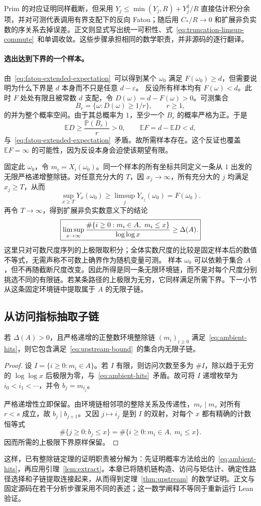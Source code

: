 Prim 的对应证明同样截断，但采用 $Y_j\le\min(Y_j,R)+Y_j^2/R$ 直接估计积分余项，并对可测代表调用有界支配下的反向 Fatou；随后用 $C_*/R\to0$ 和扩展非负实数的序关系去掉误差。正文则显式写出统一可积性、式~\eqref{eq:truncation-limsup-commute}~和单调收敛。这些步骤承担相同的数学职责，并非源码的逐行翻译。

\paragraph{选出达到下界的一个样本。}
由~\eqref{eq:fatou-extended-expectation}~可以得到某个 $\omega_0$ 满足 $F(\omega_0)\ge d$，但需要说明为什么下界是 $d$ 本身而不只是任意 $d-\varepsilon$。
反设所有样本均有 $F(\omega)<d$。此时 $F$ 处处有限且被常数 $d$ 支配，令 $D(\omega)=d-F(\omega)>0$。可测集合
\[
 B_r=\{\omega:D(\omega)\ge1/r\},\qquad r\ge1,
\]
的并为整个概率空间。由于其总概率为 $1$，至少一个 $B_r$ 的概率严格为正。于是
\[
 \mathbb E D\ge\frac{\mathbb P(B_r)}r>0,
 \qquad \mathbb E F=d-\mathbb E D<d,
\]
与~\eqref{eq:fatou-extended-expectation}~矛盾。故所需样本存在。这个反证也覆盖 $\mathbb E F=\infty$ 的可能性，因为反设本身会迫使该期望有限。

固定此 $\omega_0$，令 $m_i=X_i(\omega_0)$。同一个样本的所有坐标共同定义一条从 $1$ 出发的无限严格递增整除链。对任意充分大的 $T$，因 $x_j\to\infty$，所有充分大的 $j$ 均满足 $x_j\ge T$，从而
\[
 \sup_{x\ge T}Y_x(\omega_0)
 \ge\limsup_jY_{x_j}(\omega_0)=F(\omega_0).
\]
再令 $T\to\infty$，得到扩展非负实数意义下的结论
\begin{equation}\label{eq:ambient-hits}
 \boxed{\limsup_{x\to\infty}\frac{\#\{i\ge0:m_i\in A,\ m_i\le x\}}{\log\log x}
 \ge\Delta(A).}
\end{equation}
这里只对可数尺度序列的上极限取积分；全体实数尺度的比较是固定样本后的数值不等式，无需声称不可数上确界作为随机变量可测。
样本 $\omega_0$ 可以依赖于集合 $A$，但不再随截断尺度改变。因此所得是同一条无限环境链，而不是对每个尺度分别挑选不同的有限链。若某条路径的上极限为无穷，它同样满足所需下界。下一小节从这条固定环境链中提取属于 $A$ 的无限子链。

\subsection{从访问指标抽取子链}
\begin{lemma}[集合内子链提取]\label{lem:extract}
若 $\Delta(A)>0$，且严格递增的正整数环境整除链 $(m_i)_{i\ge0}$ 满足~\eqref{eq:ambient-hits}，则它包含满足~\eqref{eq:upstream-bound}~的集合内无限子链。
\end{lemma}
\begin{proof}
设 $I=\{i\ge0:m_i\in A\}$。若 $I$ 有限，则访问次数至多为 $\#I$，除以趋于无穷的 $\log\log x$ 后极限为零，与~\eqref{eq:ambient-hits}~矛盾。故可将 $I$ 递增枚举为 $i_0<i_1<\cdots$，并令 $b_j=m_{i_j}$。

严格递增性立即保留。由环境链相邻项的整除关系及传递性，$m_r\mid m_s$ 对所有 $r<s$ 成立，故 $b_j\mid b_{j+1}$。又因 $j\mapsto i_j$ 是到 $I$ 的双射，对每个 $x$ 都有精确的计数恒等式
\[
 \#\{j\ge0:b_j\le x\}
 =\#\{i\ge0:m_i\in A,\ m_i\le x\}.
\]
因而所需的上极限下界原样保留。
\end{proof}

这样，已有整除链定理的证明职责被分解为：先证明概率方法给出的~\eqref{eq:ambient-hits}，再应用引理~\ref{lem:extract}。本章已将随机链构造、访问与矩估计、确定性路径选择和子链提取连接起来，从而得到定理~\ref{thm:upstream}~的数学证明。正文与固定源码在若干分析步骤采用不同的表述；这一数学阐释不等同于重新运行 Lean 验证。
